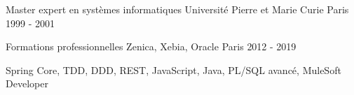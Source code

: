 

\begin{cventries}

  \cventry
    {Master expert en systèmes informatiques} %
    {Université Pierre et Marie Curie} %
    {Paris} %
    {1999 - 2001} %
    {
    }

  \cventry    
    {Formations professionnelles} %
    {Zenica, Xebia, Oracle} %
    {Paris} %
    {2012 - 2019} %
    {
      \begin{cvitems}
        Spring Core, TDD, DDD, REST, JavaScript, Java, PL/SQL avancé, MuleSoft Developer
      \end{cvitems}
    }

\end{cventries}
